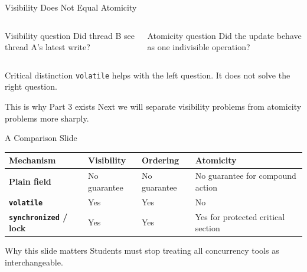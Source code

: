 \documentclass[aspectratio=169,11pt]{beamer}
\begin{document}
	\begin{frame}{Visibility Does Not Equal Atomicity}
		\begin{columns}[T]
			\begin{block}{Visibility question}
				Did thread B see thread A's latest write?
			\end{block}
			
			\begin{block}{Atomicity question}
				Did the update behave as one indivisible operation?
			\end{block}
		\end{columns}
		
		\vspace{0.35cm}
		
		\begin{alertblock}{Critical distinction}
			\texttt{volatile} helps with the left question.  
			It does not solve the right question.
		\end{alertblock}
		
		\vspace{0.25cm}
		
		\begin{exampleblock}{This is why Part 3 exists}
			Next we will separate visibility problems from atomicity problems more sharply.
		\end{exampleblock}
	\end{frame}
	
	\begin{frame}{A Comparison Slide}
		\centering
		\begin{tabular}{>{\bfseries}m{2.8cm} >{\centering\arraybackslash}m{2cm} >{\centering\arraybackslash}m{2cm} >{\centering\arraybackslash}m{2cm}}
			\toprule
			Mechanism & Visibility & Ordering & Atomicity \\
			\midrule
			Plain field & No guarantee & No guarantee & No guarantee for compound action \\
			\texttt{volatile} & Yes & Yes & No \\
			\texttt{synchronized} / lock & Yes & Yes & Yes for protected critical section \\
			\bottomrule
		\end{tabular}
		
		\vspace{0.4cm}
		
		\begin{exampleblock}{Why this slide matters}
			Students must stop treating all concurrency tools as interchangeable.
		\end{exampleblock}
	\end{frame}
	
\end{document}
